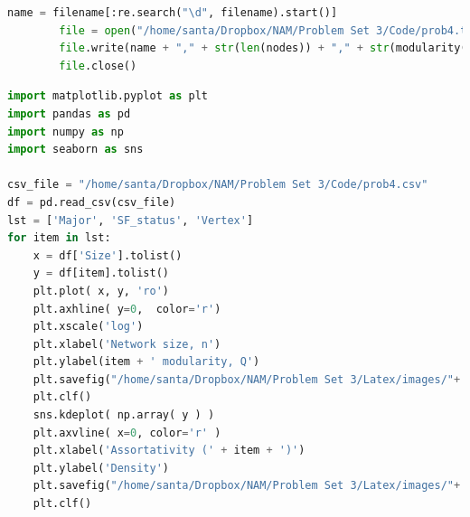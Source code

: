 \documentclass{article}
\begin{document}
\begin{lstlisting}[language=Python, breaklines=true]
        name = filename[:re.search("\d", filename).start()]
        file = open("/home/santa/Dropbox/NAM/Problem Set 3/Code/prob4.txt", "a")
        file.write(name + "," + str(len(nodes)) + "," + str(modularity(edges, sfstatus, list(sfstatusSet))) + "," + str(modularity(edges, major, list(majorSet))) + "," + str(vertexDegree(matrix, G.number_of_edges(), degree, nodes)) + "\n")
        file.close()
\end{lstlisting}

\begin{lstlisting}[language=Python, breaklines=true, caption=To plot the graphs]      
import matplotlib.pyplot as plt
import pandas as pd
import numpy as np
import seaborn as sns

csv_file = "/home/santa/Dropbox/NAM/Problem Set 3/Code/prob4.csv"
df = pd.read_csv(csv_file)
lst = ['Major', 'SF_status', 'Vertex']
for item in lst:
    x = df['Size'].tolist()
    y = df[item].tolist()
    plt.plot( x, y, 'ro')
    plt.axhline( y=0,  color='r')
    plt.xscale('log')
    plt.xlabel('Network size, n')
    plt.ylabel(item + ' modularity, Q')
    plt.savefig("/home/santa/Dropbox/NAM/Problem Set 3/Latex/images/"+ item+".png")
    plt.clf()
    sns.kdeplot( np.array( y ) )
    plt.axvline( x=0, color='r' )
    plt.xlabel('Assortativity (' + item + ')')
    plt.ylabel('Density')
    plt.savefig("/home/santa/Dropbox/NAM/Problem Set 3/Latex/images/"+ item+"_density.png" )
    plt.clf()
\end{lstlisting}
\newpage
\end{document}
